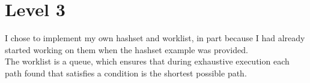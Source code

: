 \section{Level 3}

I chose to implement my own hashset and worklist, in part because I had
already started working on them when the hashset example was provided.\\

The worklist is a queue, which ensures that during exhaustive execution each
path found that satisfies a condition is the shortest possible path.\\


